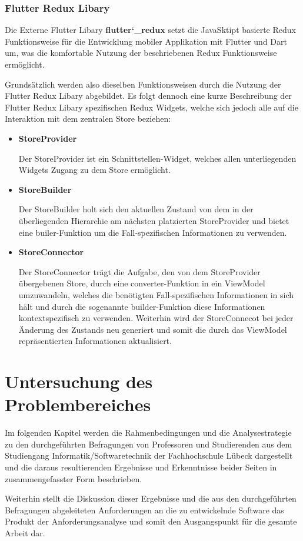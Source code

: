 \documentclass[bibliography=totoc,listof=totoc,BCOR=5mm,DIV=12,oneside]{scrbook}
\begin{document}
\subsection{Flutter Redux Libary}
\par Die Externe Flutter Libary \textbf{flutter\char`_redux}\citep{FlutterReduxLib} setzt die JavaSktipt basierte Redux Funktionsweise für die Entwicklung mobiler Applikation mit Flutter und Dart um, was die komfortable Nutzung der beschriebenen Redux Funktionsweise ermöglicht.

\par \bigskip Grundsätzlich werden also dieselben Funktionsweisen durch die Nutzung der Flutter Redux Libary abgebildet. Es folgt dennoch eine kurze Beschreibung der Flutter Redux Libary spezifischen Redux Widgets, welche sich jedoch alle auf die Interaktion mit dem zentralen Store beziehen:

\begin{itemize}
\item \textbf{StoreProvider}
\par Der StoreProvider ist ein Schnittstellen-Widget, welches allen unterliegenden Widgets Zugang zu dem Store ermöglicht.
\item \textbf{StoreBuilder}
\par Der StoreBuilder holt sich den aktuellen Zustand von dem in der überliegenden Hierarchie am nächsten platzierten StoreProvider und bietet eine builer-Funktion um die Fall-spezifischen Informationen zu verwenden.
\item \textbf{StoreConnector}
\par Der StoreConnector trägt die Aufgabe, den von dem StoreProvider übergebenen Store, durch eine converter-Funktion in ein ViewModel umzuwandeln, welches die benötigten Fall-spezifischen Informationen in sich hält und durch die sogenannte builder-Funktion diese Informationen kontextspezifisch zu verwenden. Weiterhin wird der StoreConnecot bei jeder Änderung des Zustands neu generiert und somit die durch das ViewModel repräsentierten Informationen aktualisiert.
\end{itemize}

\newpage
\chapter{Untersuchung des Problembereiches} \label{chap:problemanalyse}
\par Im folgenden Kapitel werden die Rahmenbedingungen und die Analysestrategie zu den durchgeführten Befragungen von Professoren und Studierenden aus dem Studiengang Informatik/Softwaretechnik der Fachhochschule Lübeck dargestellt und die daraus resultierenden Ergebnisse und Erkenntnisse beider Seiten in zusammengefasster Form beschrieben. 
\par Weiterhin stellt die Diskussion dieser Ergebnisse und die aus den durchgeführten Befragungen abgeleiteten Anforderungen an die zu entwickelnde Software das Produkt der Anforderungsanalyse und somit den Ausgangspunkt für die gesamte Arbeit dar.
\end{document}
